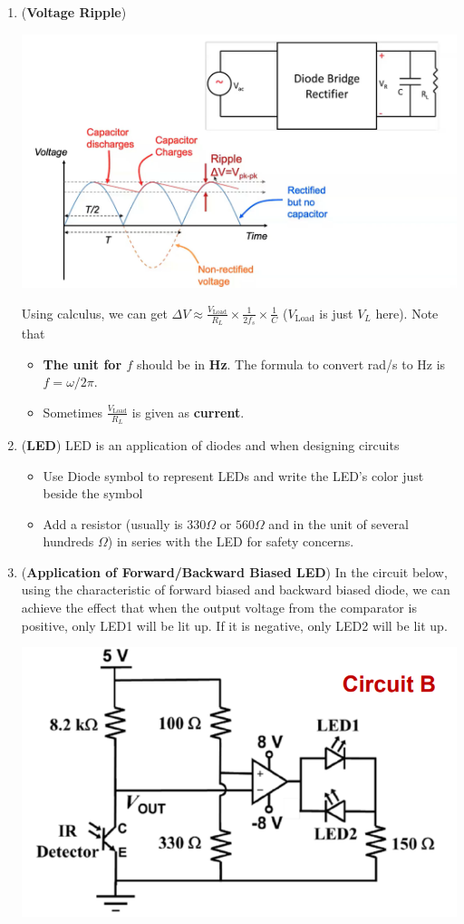 \documentclass[10pt, landscape]{article}
\begin{document}
\begin{multicols}{4}
\begin{enumerate}
    \item (\textbf{Voltage Ripple}) \\
    \centerline{\includegraphics[width=0.9\linewidth]{images/voltage-ripple.png}}
    Using calculus, we can get $\Delta V \approx \frac{V_{\text{Load}}}{R_L}\times \frac{1}{2f_s} \times \frac{1}{C}$ ($V_{\text{Load}}$ is just $V_L$ here). Note that
    \begin{itemize}
        \item \textbf{The unit for $f$} should be in \textbf{Hz}. The formula to convert rad/s to Hz is $f=\omega / 2\pi$.
        \item Sometimes $\frac{V_{\text{Load}}}{R_L}$ is given as \textbf{current}.
    \end{itemize}
    \item (\textbf{LED}) LED is an application of diodes and when designing circuits
    \begin{itemize}
        \item Use Diode symbol to represent LEDs and write the LED's color just beside the symbol
        \item Add a resistor (usually is $330\Omega$ or $560\Omega$ and in the unit of several hundreds $\Omega$) in series with the LED for safety concerns.
    \end{itemize}
    \item (\textbf{Application of Forward/Backward Biased LED}) In the circuit below, using the characteristic of forward biased and backward biased diode, we can achieve the effect that when the output voltage from the comparator is positive, only LED1 will be lit up. If it is negative, only LED2 will be lit up. \\
    \centerline{\includegraphics[width=0.7\linewidth]{images/biased-led-application.png}}
\end{enumerate}


\end{multicols}
\end{document}
